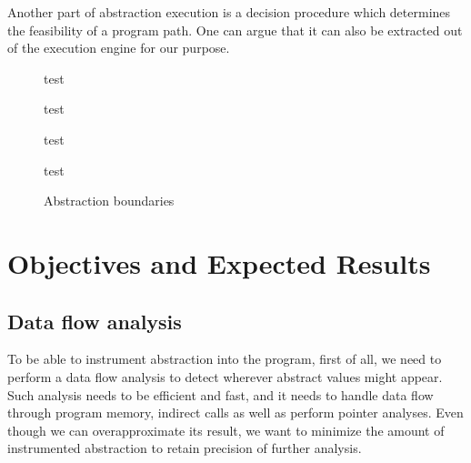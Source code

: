 Another part of abstraction execution is a decision procedure which determines
the feasibility of a program path. One can argue that it can also be extracted
out of the execution engine for our purpose.

\begin{figure}[h]
    \begin{minipage}[t]{0.45\textwidth}
        test
    \begin{tikzpicture}
    \end{tikzpicture}
    \end{minipage}
    \hfill
    \begin{minipage}[t]{0.45\textwidth}
        test
    \begin{tikzpicture}
    \end{tikzpicture}
    \end{minipage}

    \begin{minipage}[t]{0.45\textwidth}
        test
    \begin{tikzpicture}
    \end{tikzpicture}
    \end{minipage}
    \hfill
    \begin{minipage}[t]{0.45\textwidth}
        test
    \begin{tikzpicture}
    \end{tikzpicture}
    \end{minipage}

\caption{Abstraction boundaries}
\end{figure}



\section{Objectives and Expected Results}
\label{sec:objectives}

\subsection{Data flow analysis}

To be able to instrument abstraction into the program, first of all, we need to
perform a data flow analysis to detect wherever abstract values might appear.
Such analysis needs to be efficient and fast, and it needs to handle data flow
through program memory, indirect calls as well as perform pointer analyses. Even though we can
overapproximate its result, we want to minimize the amount of instrumented
abstraction to retain precision of further analysis.

